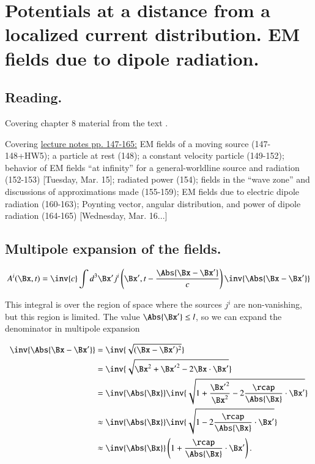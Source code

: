 %
%

\chapter{Potentials at a distance from a localized current distribution.  EM fields due to dipole radiation.}
\label{chap:relativisticElectrodynamicsL20}
{}
\date{Mar 15, 2011}

\beginArtNoToc

\section{Reading.}

Covering chapter 8 material from the text \citep{landau1980classical}.

Covering \href{http://www.physics.utoronto.ca/~poppitz/epoppitz/PHY450_files/RelEMpp147-165.pdf}{lecture notes pp. 147-165:} EM fields of a moving source (147-148+HW5); a particle at rest (148); a constant velocity particle (149-152); behavior of EM fields ``at infinity'' for a general-worldline source and radiation (152-153) [Tuesday, Mar. 15]; radiated power (154); fields in the ``wave zone'' and discussions of approximations made (155-159); EM fields due to electric dipole radiation (160-163); Poynting vector, angular distribution, and power of dipole radiation (164-165) [Wednesday, Mar. 16...]

\section{Multipole expansion of the fields.}

\begin{equation}\label{eqn:relativisticElectrodynamicsL20:10}
A^i(\Bx, t) = \inv{c} \int d^3 \Bx' j^i\left(\Bx', t - \frac{\Abs{\Bx - \Bx'} }{c}\right) \inv{\Abs{\Bx - \Bx'} }
\end{equation}

This integral is over the region of space where the sources $j^i$ are non-vanishing, but this region is limited.  The value $\Abs{\Bx'} \le l$, so we can expand the denominator in multipole expansion

\begin{align*}
\inv{\Abs{\Bx - \Bx'} }
&=
\inv{\sqrt{(\Bx - \Bx')^2} } \\
&=
\inv{\sqrt{\Bx^2 + {\Bx'}^2 - 2 \Bx \cdot \Bx'} } \\
&=
\inv{\Abs{\Bx} } \inv{\sqrt{1 + \frac{{\Bx'}^2}{\Bx^2} - 2 \frac{\rcap}{\Abs{\Bx} } \cdot \Bx'} } \\
&\approx
\inv{\Abs{\Bx} } \inv{\sqrt{1 - 2 \frac{\rcap}{\Abs{\Bx} } \cdot \Bx'} } \\
&\approx
\inv{\Abs{\Bx} } \left(1 + \frac{\rcap}{\Abs{\Bx} } \cdot \Bx' \right).
\end{align*}

